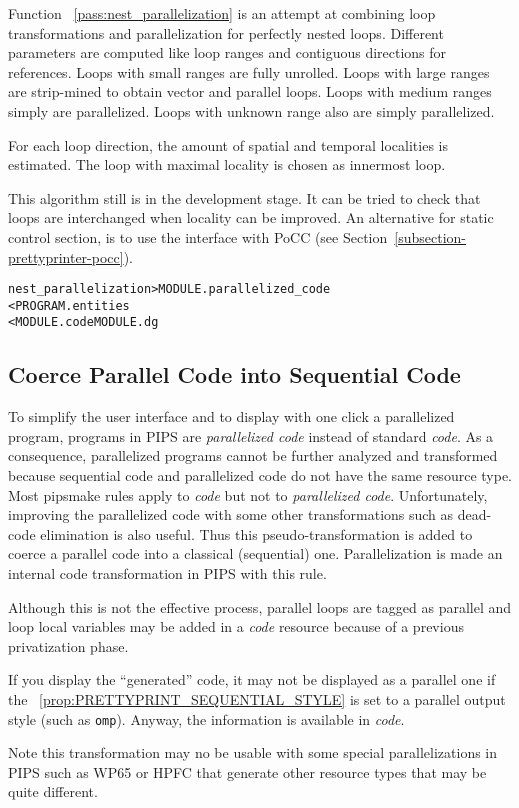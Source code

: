\documentclass[a4paper]{report}
\newenvironment{PipsMake}{\begin{alltt}}{\end{alltt}}
\newcommand{\PipsPropRef}[1]{\texttt{\detokenize{#1}}~\ref{prop:#1}}
\newcommand{\PipsPassRef}[1]{\texttt{\detokenize{#1}}~\ref{pass:#1}}
\newenvironment{PipsPass}[1]{\label{pass:#1}}{}
\begin{document}
\begin{PipsPass}{nest_parallelization}
Function \PipsPassRef{nest_parallelization} is an attempt at combining loop
transformations and parallelization for perfectly nested
loops. Different parameters are computed like loop ranges and contiguous
directions for references. Loops with small ranges are fully
unrolled. Loops with large ranges are strip-mined to obtain vector and
parallel loops. Loops with medium ranges simply are parallelized. Loops
with unknown range also are simply parallelized.

For each loop direction, the amount of spatial and temporal localities
is estimated. The loop with maximal locality is chosen as innermost
loop.

This algorithm still is in the development stage. It can be tried to
check that loops are interchanged when locality can be
improved. An alternative for static control
section, is to use the interface with PoCC (see Section~\ref{subsection-prettyprinter-pocc}).

\end{PipsPass}

\begin{PipsMake}
nest_parallelization                    > MODULE.parallelized_code
        < PROGRAM.entities
        < MODULE.code MODULE.dg
\end{PipsMake}


\subsection{Coerce Parallel Code into Sequential Code}
\label{sec:cons-parall-code}

\begin{PipsPass}{internalize_parallel_code}
To simplify the user interface and to display with one click a
parallelized program, programs in PIPS are {\em parallelized code}
instead of standard {\em code}. As a consequence, parallelized
programs cannot be further analyzed and transformed because sequential
code and parallelized code do not have the same resource type. Most
pipsmake rules apply to {\em code} but not to {\em parallelized
code}. Unfortunately, improving the parallelized code with some other
transformations such as dead-code elimination is also useful. Thus
this pseudo-transformation is added to coerce a parallel code into a
classical (sequential) one. Parallelization is made an internal code
transformation in PIPS with this rule.

Although this is not the effective process, parallel loops are tagged
as parallel and loop local variables may be added in a {\em code}
resource because of a previous privatization phase.

If you display the ``generated'' code, it may not be displayed as a
parallel one if the \PipsPropRef{PRETTYPRINT_SEQUENTIAL_STYLE} is set
to a parallel output style (such as \texttt{omp}). Anyway, the information
is available in {\em code}.

Note this transformation may no be usable with some special
parallelizations in PIPS such as WP65 or HPFC that generate other resource
types that may be quite different.
\end{PipsPass}
\end{document}
